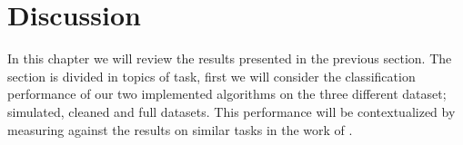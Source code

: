 \chapter{Discussion}
In this chapter we will review the results presented in the previous section. The section is divided in topics of task, first we will consider the classification performance of our two implemented algorithms on the three different dataset; simulated, cleaned and full datasets. This performance will be contextualized by measuring against the results on similar tasks in the work of \citet{Kuchera2019}. 